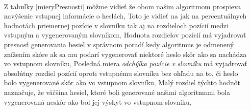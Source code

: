 \paragraph{}
Z tabuľky \ref{mieryPresnosti} môžme vidieť že obom našim algoritmom prospieva navýšenie vstupnej informácie o heslách, Toto je vidieť na jak na percentuálnych hodnotách priemernej pozície v slovníku tak aj na rozdieloch pozícií medzi vstupným a vygenerovaným slovníkom, Hodnota rozdielov pozícií má vyjadrovať presnosť generovania hesiel v správnom poradí kedy algoritmus je odmenený znížením skóre ak sa mu podarí vygenerovať niektoré heslo skôr ako sa nachádza vo vstupnom slovníku, Posledná miera \emph{odchýlka pozície v slovníku} má vyjadrovať absolútny rozdiel pozícií oproti vstupnému slovníku bez ohľadu na to, či heslo bolo vygenerované skôr ako vo vstupnom slovníku, Malý rozdiel týchto hodnôt naznačuje, že väčšina hesiel, ktoré boli generované našimi algoritmami bola vygenerovaná neskôr ako bol jej výskyt vo vstupnom slovníku,